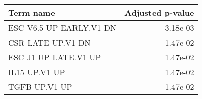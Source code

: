 \begin{tabular}{lr}
\toprule
              Term name &  Adjusted p-value \\
\midrule
ESC V6.5 UP EARLY.V1 DN &          3.18e-03 \\
      CSR LATE UP.V1 DN &          1.47e-02 \\
   ESC J1 UP LATE.V1 UP &          1.47e-02 \\
          IL15 UP.V1 UP &          1.47e-02 \\
          TGFB UP.V1 UP &          1.47e-02 \\
\bottomrule
\end{tabular}
